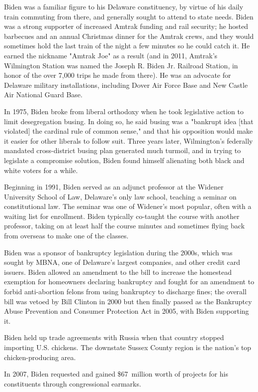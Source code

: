 Biden was a familiar figure to his Delaware constituency, by virtue of
his daily train commuting from there, and generally sought to attend to
state needs. Biden was a strong supporter of increased Amtrak funding
and rail security; he hosted barbecues and an annual Christmas dinner
for the Amtrak crews, and they would sometimes hold the last train of
the night a few minutes so he could catch it. He earned the nickname
"Amtrak Joe" as a result (and in 2011, Amtrak's Wilmington Station was
named the Joseph R. Biden Jr. Railroad Station, in honor of the over
7,000 trips he made from there). He was an advocate for Delaware
military installations, including Dover Air Force Base and New Castle
Air National Guard Base.

In 1975, Biden broke from liberal orthodoxy when he took legislative
action to limit desegregation busing. In doing so, he said busing was a
"bankrupt idea {[}that violated{]} the cardinal rule of common sense,"
and that his opposition would make it easier for other liberals to
follow suit. Three years later, Wilmington's federally mandated
cross-district busing plan generated much turmoil, and in trying to
legislate a compromise solution, Biden found himself alienating both
black and white voters for a while.

Beginning in 1991, Biden served as an adjunct professor at the Widener
University School of Law, Delaware's only law school, teaching a seminar
on constitutional law. The seminar was one of Widener's most popular,
often with a waiting list for enrollment. Biden typically co-taught the
course with another professor, taking on at least half the course
minutes and sometimes flying back from overseas to make one of the
classes.

Biden was a sponsor of bankruptcy legislation during the 2000s, which
was sought by MBNA, one of Delaware's largest companies, and other
credit card issuers. Biden allowed an amendment to the bill to increase
the homestead exemption for homeowners declaring bankruptcy and fought
for an amendment to forbid anti-abortion felons from using bankruptcy to
discharge fines; the overall bill was vetoed by Bill Clinton in 2000 but
then finally passed as the Bankruptcy Abuse Prevention and Consumer
Protection Act in 2005, with Biden supporting it.

Biden held up trade agreements with Russia when that country stopped
importing U.S. chickens. The downstate Sussex County region is the
nation's top chicken-producing area.

In 2007, Biden requested and gained \$67~million worth of projects for
his constituents through congressional earmarks.

